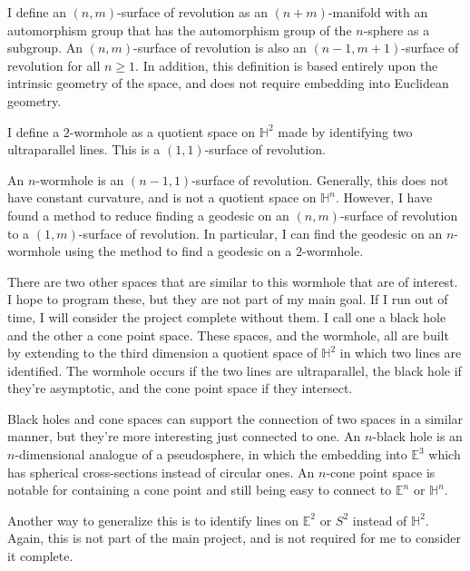 \documentclass[12pt]{amsart}
\newcommand{\ignore}[1]{}
\begin{document}
I define an $(n,m)$-surface of revolution as an $(n+m)$-manifold with an automorphism group that has the automorphism group of the $n$-sphere as a subgroup. An $(n,m)$-surface of revolution is also an $(n-1,m+1)$-surface of revolution for all $n \geq 1$. In addition, this definition is based entirely upon the intrinsic geometry of the space, and does not require embedding into Euclidean geometry.


I define a $2$-wormhole as a quotient space on $\mathbb{H}^2$ made by identifying two ultraparallel lines. This is a $(1,1)$-surface of revolution.

An $n$-wormhole is an $(n-1,1)$-surface of revolution. Generally, this does not have constant curvature, and is not a quotient space on $\mathbb{H}^n$. However, I have found a method to reduce finding a geodesic on an $(n,m)$-surface of revolution to a $(1,m)$-surface of revolution. In particular, I can find the geodesic on an $n$-wormhole using the method to find a geodesic on a $2$-wormhole.

There are two other spaces that are similar to this wormhole that are of interest. I hope to program these, but they are not part of my main goal. If I run out of time, I will consider the project complete without them. I call one a black hole and the other a cone point space. These spaces, and the wormhole, all are built by extending to the third dimension a quotient space of $\mathbb{H}^2$ in which two lines are identified. The wormhole occurs if the two lines are ultraparallel, the black hole if they're asymptotic, and the cone point space if they intersect.

Black holes and cone spaces can support the connection of two spaces in a similar manner, but they're more interesting just connected to one. \ignore{Why?} An $n$-black hole is an $n$-dimensional analogue of a pseudosphere, in which the embedding into $\mathbb{E}^3$ which has spherical cross-sections instead of circular ones. An $n$-cone point space is notable for containing a cone point and still being easy to connect to $\mathbb{E}^n$ or $\mathbb{H}^n$.

Another way to generalize this is to identify lines on $\mathbb{E}^2$ or $S^2$ instead of $\mathbb{H}^2$. Again, this is not part of the main project, and is not required for me to consider it complete.
\end{document}
